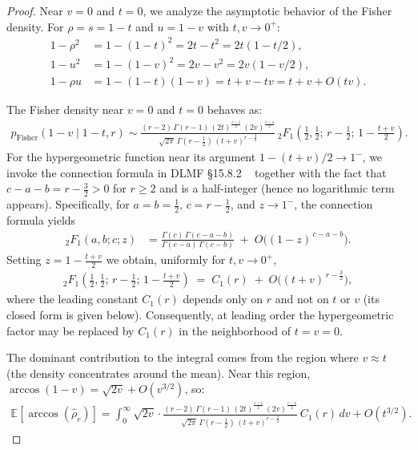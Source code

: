 \begin{proof}
Near \( v=0 \) and \( t=0 \), we analyze the asymptotic behavior of the Fisher density. For \( \rho = s = 1-t \) and \( u = 1-v \) with \( t, v \to 0^+ \):
\begin{align}
1-\rho^2 &= 1 - (1-t)^2 = 2t - t^2 = 2t(1 - t/2), \\
1-u^2 &= 1 - (1-v)^2 = 2v - v^2 = 2v(1 - v/2), \\
1-\rho u &= 1 - (1-t)(1-v) = t + v - tv = t + v + O(tv).
\end{align}

The Fisher density near \( v=0 \) and \( t=0 \) behaves as:
\begin{align}
p_{\text{Fisher}}(1-v \mid 1-t, r) \sim \frac{(r-2)\,\Gamma(r-1)\,(2t)^{\frac{r-1}{2}}\,(2v)^{\frac{r-4}{2}}}{\sqrt{2\pi}\,\Gamma(r-\tfrac{1}{2})\,(t+v)^{r-\frac{3}{2}}}\,{}_2F_1\!\left(\tfrac{1}{2},\tfrac{1}{2};\, r-\tfrac{1}{2};\, 1 - \tfrac{t+v}{2}\right).
\end{align}
For the hypergeometric function near its argument \( 1 - (t+v)/2 \to 1^- \), 
we invoke the connection formula in DLMF §15.8.2 ~\cite{nist_dlmf} together with the fact that
\( c-a-b = r-\tfrac{3}{2} > 0 \) for \( r\ge 2 \) and is a half-integer (hence no logarithmic term appears). 
Specifically, for \( a=b=\tfrac{1}{2} \), \( c=r-\tfrac{1}{2} \), and \( z\to 1^- \),
the connection formula yields
\begin{align}
{}_2F_1(a,b;c;z)
&= \frac{\Gamma(c)\,\Gamma(c-a-b)}{\Gamma(c-a)\,\Gamma(c-b)} \;+\; O\!\big((1-z)^{\,c-a-b}\big).
\end{align}
Setting \( z = 1 - \tfrac{t+v}{2} \) we obtain, uniformly for \( t,v\to 0^+ \),
\begin{align}
{}_2F_1\!\left(\tfrac{1}{2},\tfrac{1}{2};\, r-\tfrac{1}{2};\, 1 - \tfrac{t+v}{2}\right)
\;=\; C_1(r) \;+\; O\!\big((t+v)^{\,r-\tfrac{3}{2}}\big),
\end{align}
where the leading constant \( C_1(r) \) depends only on \( r \) and not on \( t \) or \( v \) (its closed form is given below). 
Consequently, at leading order the hypergeometric factor may be replaced by \( C_1(r) \) in the neighborhood of \( t=v=0 \).

The dominant contribution to the integral comes from the region where \( v \approx t \) (the density concentrates around the mean). Near this region, \( \arccos(1-v) = \sqrt{2v} + O(v^{3/2}) \), so:
\begin{align}
\mathbb{E}[\arccos(\hat{\rho}_r)] = \int_{0}^{\infty} \sqrt{2v} \cdot \frac{(r-2)\,\Gamma(r-1)\,(2t)^{\frac{r-1}{2}}\,(2v)^{\frac{r-4}{2}}}{\sqrt{2\pi}\,\Gamma(r-\tfrac{1}{2})\,(t+v)^{r-\frac{3}{2}}}\,C_1(r) \, dv + O(t^{3/2}).
\end{align}


\end{proof}
